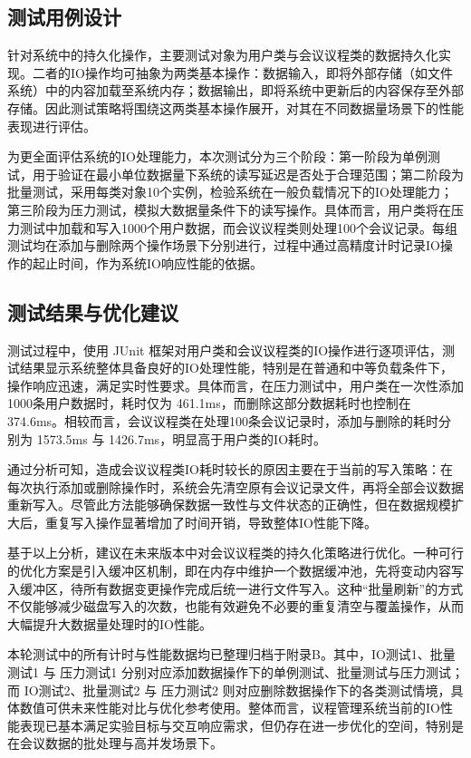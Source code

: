 \documentclass[a4paper, twoside, utf8]{ctexart}
\begin{document}
    \subsection{测试用例设计}

    针对系统中的持久化操作，主要测试对象为用户类与会议议程类的数据持久化实现。二者的IO操作均可抽象为两类基本操作：数据输入，即将外部存储（如文件系统）中的内容加载至系统内存；数据输出，即将系统中更新后的内容保存至外部存储。因此测试策略将围绕这两类基本操作展开，对其在不同数据量场景下的性能表现进行评估。

    为更全面评估系统的IO处理能力，本次测试分为三个阶段：第一阶段为单例测试，用于验证在最小单位数据量下系统的读写延迟是否处于合理范围；第二阶段为批量测试，采用每类对象10个实例，检验系统在一般负载情况下的IO处理能力；第三阶段为压力测试，模拟大数据量条件下的读写操作。具体而言，用户类将在压力测试中加载和写入1000个用户数据，而会议议程类则处理100个会议记录。每组测试均在添加与删除两个操作场景下分别进行，过程中通过高精度计时记录IO操作的起止时间，作为系统IO响应性能的依据。

    \subsection{测试结果与优化建议}

    测试过程中，使用 JUnit 框架对用户类和会议议程类的IO操作进行逐项评估，测试结果显示系统整体具备良好的IO处理性能，特别是在普通和中等负载条件下，操作响应迅速，满足实时性要求。具体而言，在压力测试中，用户类在一次性添加1000条用户数据时，耗时仅为 461.1ms，而删除这部分数据耗时也控制在 374.6ms。相较而言，会议议程类在处理100条会议记录时，添加与删除的耗时分别为 1573.5ms 与 1426.7ms，明显高于用户类的IO耗时。

    通过分析可知，造成会议议程类IO耗时较长的原因主要在于当前的写入策略：在每次执行添加或删除操作时，系统会先清空原有会议记录文件，再将全部会议数据重新写入。尽管此方法能够确保数据一致性与文件状态的正确性，但在数据规模扩大后，重复写入操作显著增加了时间开销，导致整体IO性能下降。

    基于以上分析，建议在未来版本中对会议议程类的持久化策略进行优化。一种可行的优化方案是引入缓冲区机制，即在内存中维护一个数据缓冲池，先将变动内容写入缓冲区，待所有数据变更操作完成后统一进行文件写入。这种“批量刷新”的方式不仅能够减少磁盘写入的次数，也能有效避免不必要的重复清空与覆盖操作，从而大幅提升大数据量处理时的IO性能。

    本轮测试中的所有计时与性能数据均已整理归档于附录B。其中，IO测试1、批量测试1 与 压力测试1 分别对应添加数据操作下的单例测试、批量测试与压力测试；而 IO测试2、批量测试2 与 压力测试2 则对应删除数据操作下的各类测试情境，具体数值可供未来性能对比与优化参考使用。整体而言，议程管理系统当前的IO性能表现已基本满足实验目标与交互响应需求，但仍存在进一步优化的空间，特别是在会议数据的批处理与高并发场景下。
\end{document}
